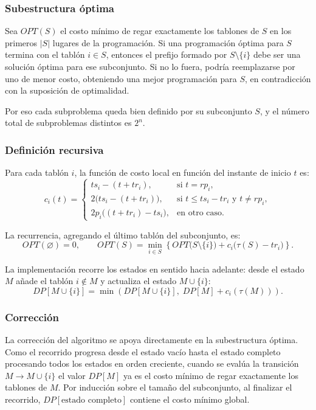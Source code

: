 \documentclass[12pt,a4paper]{article}
\newcommand{\cost}[1]{c_{#1}}
\begin{document}
\subsubsection{Subestructura \'optima}

Sea \(OPT(S)\) el costo m\'inimo de regar exactamente los tablones de \(S\) en los primeros \(|S|\) lugares de la programaci\'on. Si una programaci\'on \'optima para \(S\) termina con el tabl\'on \(i \in S\), entonces el prefijo formado por \(S \setminus \{i\}\) debe ser una soluci\'on \'optima para ese subconjunto. Si no lo fuera, podr\'ia reemplazarse por uno de menor costo, obteniendo una mejor programaci\'on para \(S\), en contradicci\'on con la suposici\'on de optimalidad.

Por eso cada subproblema queda bien definido por su subconjunto \(S\), y el n\'umero total de subproblemas distintos es \(2^n\).

\subsubsection{Definici\'on recursiva}

Para cada tabl\'on \(i\), la funci\'on de costo local en funci\'on del instante de inicio \(t\) es:
\[
\cost{i}(t)=
\begin{cases}
ts_i - (t + tr_i), & \text{si } t = rp_i, \\[4pt]
2\bigl(ts_i - (t + tr_i)\bigr), & \text{si } t \leq ts_i - tr_i \text{ y } t \neq rp_i, \\[4pt]
2p_i\bigl((t + tr_i) - ts_i\bigr), & \text{en otro caso.}
\end{cases}
\]

La recurrencia, agregando el \'ultimo tabl\'on del subconjunto, es:
\[
OPT(\varnothing)=0,
\qquad
OPT(S)=\min_{i\in S}\left\{ OPT\bigl(S\setminus\{i\}\bigr) + \cost{i}\bigl(\tau(S)-tr_i\bigr) \right\}.
\]

La implementaci\'on recorre los estados en sentido hacia adelante: desde el estado \(M\) a\~nade el tabl\'on \(i \notin M\) y actualiza el estado \(M \cup \{i\}\):
\[
DP[M \cup \{i\}] =
\min\left(DP[M \cup \{i\}],\; DP[M] + \cost{i}(\tau(M))\right).
\]

\subsubsection{Correcci\'on}

La correcci\'on del algoritmo se apoya directamente en la subestructura \'optima. Como el recorrido progresa desde el estado vac\'io hasta el estado completo procesando todos los estados en orden creciente, cuando se eval\'ua la transici\'on \(M \to M \cup \{i\}\) el valor \(DP[M]\) ya es el costo m\'inimo de regar exactamente los tablones de \(M\). Por inducci\'on sobre el tama\~no del subconjunto, al finalizar el recorrido, \(DP[\text{estado completo}]\) contiene el costo m\'inimo global.
\end{document}
